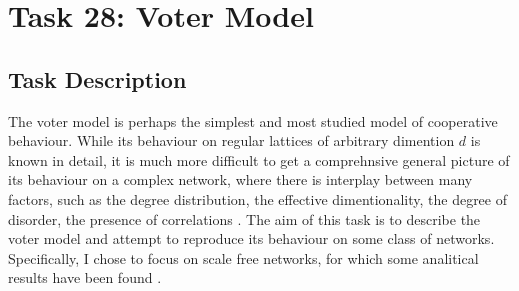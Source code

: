 \chapter{Task 28: Voter Model}

\section{Task Description}
The voter model is perhaps the simplest and most studied model of cooperative behaviour. While its behaviour on regular lattices of arbitrary dimention $d$ is known in detail, it is much more difficult to get a comprehnsive general picture of its behaviour on a complex network, where there is interplay between many factors, such as the degree distribution, the effective dimentionality, the degree of disorder, the presence of correlations \cite{suchecki_numerical}. 
The aim of this task is to describe the voter model and attempt to reproduce its behaviour on some class of networks. Specifically, I chose to focus on scale free networks, for which some analitical results have been found \cite{sood}. 

